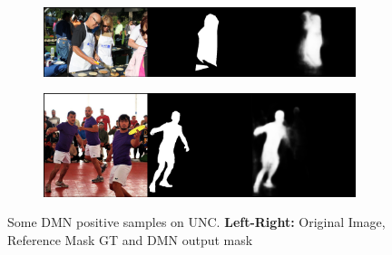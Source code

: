 \begin{figure}[!htbp]
    \ContinuedFloat
	\centering
    \begin{subfigure}[b]{\columnwidth}
            \centering
            \includegraphics[width=\textwidth]{./figures/unc_samples/5.png}
    \end{subfigure}
    \begin{subfigure}[b]{\columnwidth}
            \centering
            \includegraphics[width=\textwidth]{./figures/unc_samples/6.png}
    \end{subfigure}
    
    \caption{Some DMN positive samples on UNC. \textbf{Left-Right:} Original Image, Reference Mask GT and DMN output mask}
    \label{Fig:UNC_Pos}
\end{figure}

